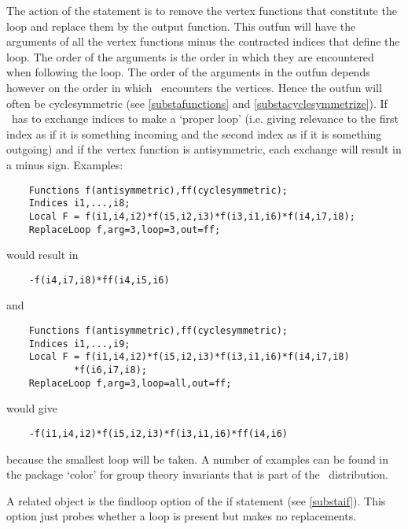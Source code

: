 \noindent The action of the statement is to remove the vertex functions 
that constitute the loop and replace them by the output function. This 
outfun will have the arguments of all the vertex functions minus the 
contracted indices that define the loop. The order of the arguments is the 
order in which they are encountered when following the loop. The order of 
the arguments in the outfun depends however on the order in which \FORM\ 
encounters the vertices. Hence the outfun will often be 
cyclesymmetric (see 
\ref{substafunctions} and \ref{substacyclesymmetrize}). If \FORM\ has to 
exchange indices to make a `proper loop' (i.e. giving relevance to the 
first index as if it is something incoming and the second index as if it is 
something outgoing) and if the vertex function is 
antisymmetric, each exchange will 
result in a minus sign. Examples:
\begin{verbatim}
    Functions f(antisymmetric),ff(cyclesymmetric);
    Indices i1,...,i8;
    Local F = f(i1,i4,i2)*f(i5,i2,i3)*f(i3,i1,i6)*f(i4,i7,i8);
    ReplaceLoop f,arg=3,loop=3,out=ff;
\end{verbatim}
would result in
\begin{verbatim}
    -f(i4,i7,i8)*ff(i4,i5,i6)
\end{verbatim}
and
\begin{verbatim}
    Functions f(antisymmetric),ff(cyclesymmetric);
    Indices i1,...,i9;
    Local F = f(i1,i4,i2)*f(i5,i2,i3)*f(i3,i1,i6)*f(i4,i7,i8)
            *f(i6,i7,i8);
    ReplaceLoop f,arg=3,loop=all,out=ff;
\end{verbatim}
would give
\begin{verbatim}
    -f(i1,i4,i2)*f(i5,i2,i3)*f(i3,i1,i6)*ff(i4,i6)
\end{verbatim}
because the smallest loop will be taken. A number of examples can be found 
in the package\index{package!color} `color'\index{color package} for group 
theory\index{group theory} invariants that is part of the \FORM\ 
distribution. 

\noindent A related object is the findloop option of the 
if statement (see \ref{substaif}). This option just probes 
whether a loop is present but makes no replacements.\vspace{10mm}


